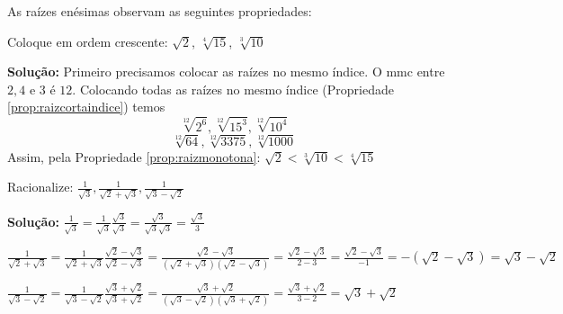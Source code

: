 As raízes enésimas observam as seguintes propriedades:
 \begin{exeresol}
 Coloque em ordem crescente: $\sqrt{2}$, $\sqrt[4]{15}$, $\sqrt[3]{10}$
 
 
  \textbf{Solução:} Primeiro precisamos colocar as raízes no mesmo índice. O mmc entre $2,4$ e $3$ é $12$. Colocando todas as raízes no mesmo índice (Propriedade \ref{prop:raizcortaindice}) temos $$\sqrt[12]{2^6}, \sqrt[12]{15^3}, \sqrt[12]{10^4}$$ $$\sqrt[12]{64},\sqrt[12]{3375},\sqrt[12]{1000}$$Assim, pela Propriedade \ref{prop:raizmonotona}: $\sqrt{2}<\sqrt[3]{10}<\sqrt[4]{15}$
\end{exeresol} 

\begin{exeresol}
Racionalize: $\frac{1}{\sqrt{3}},\frac{1}{\sqrt{2}+\sqrt{3}}, \frac{1}{\sqrt{3}-\sqrt{2}}$


 \textbf{Solução:} $\frac{1}{\sqrt{3}} = \frac{1}{\sqrt{3}} \frac{\sqrt{3}}{\sqrt{3}}=\frac{\sqrt{3}}{\sqrt{3}\sqrt{3}} = \frac{\sqrt{3}}{3}$
 
 $\frac{1}{\sqrt{2}+\sqrt{3}} = \frac{1}{\sqrt{2}+\sqrt{3}} \frac{\sqrt{2}-\sqrt{3}}{\sqrt{2}-\sqrt{3}} = \frac{\sqrt{2}-\sqrt{3}}{(\sqrt{2}+\sqrt{3})(\sqrt{2}-\sqrt{3})} = \frac{\sqrt{2}-\sqrt{3}}{2-3}=\frac{\sqrt{2}-\sqrt{3}}{-1}= -(\sqrt{2}-\sqrt{3}) = \sqrt{3}-\sqrt{2}$
 
 $\frac{1}{\sqrt{3}-\sqrt{2}}= \frac{1}{\sqrt{3}-\sqrt{2}}\frac{\sqrt{3}+\sqrt{2}}{\sqrt{3}+\sqrt{2}} = \frac{\sqrt{3}+\sqrt{2}}{(\sqrt{3}-\sqrt{2})(\sqrt{3}+\sqrt{2})}=\frac{\sqrt{3}+\sqrt{2}}{3-2}=\sqrt{3}+\sqrt{2}$
 \end{exeresol}

